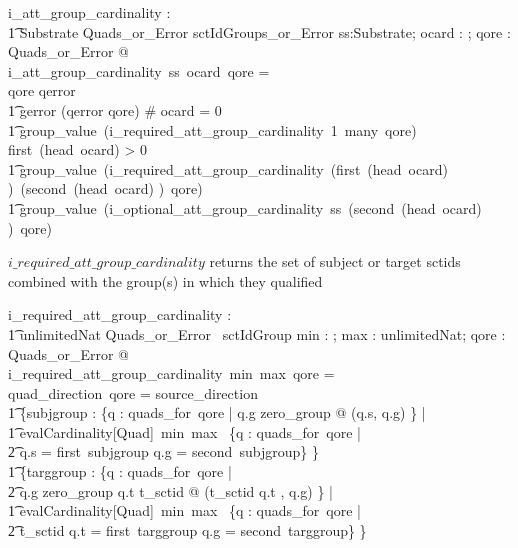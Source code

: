 \documentclass{article}
\begin{document}
\begin{gendef}
   i\_att\_group\_cardinality : \\
\t1 Substrate \fun \optional[cardinality] \fun Quads\_or\_Error \fun sctIdGroups\_or\_Error
\where
   \forall ss:Substrate; ocard : \optional[cardinality]; qore : Quads\_or\_Error @ \\
   i\_att\_group\_cardinality~ss~ocard~qore = \\
\IF qore \in \ran qerror \THEN \\
\t1 gerror (qerror \inv qore) 
\also
\ELSE \IF \# ocard = 0 \THEN \\
\t1 group\_value~(i\_required\_att\_group\_cardinality~1~many~qore)
\also
\ELSE \IF first~(head~ocard) > 0 \THEN \\
\t1 group\_value~(i\_required\_att\_group\_cardinality~(first~(head~ocard) )~(second~(head~ocard) )~qore)
\also
\ELSE \\
\t1 group\_value~(i\_optional\_att\_group\_cardinality~ss~(second~(head~ocard) )~qore)
\end{gendef}

$i\_required\_att\_group\_cardinality$ returns the set of subject or target sctids combined with the group(s) in which they qualified
\begin{gendef}
   i\_required\_att\_group\_cardinality : \\
\t1 \nat \fun unlimitedNat \fun Quads\_or\_Error \ \fun \power sctIdGroup
\where
   \forall min : \nat; max : unlimitedNat; qore : Quads\_or\_Error  @ \\
i\_required\_att\_group\_cardinality~min~max~qore = \\
\IF quad\_direction~qore = source\_direction \THEN \\
\t1 \{subjgroup :  \{q : quads\_for~qore | q.g \neq zero\_group @ (q.s, q.g) \} | \\
\t1 evalCardinality[Quad]~min~max~ \{q : quads\_for~qore | \\
\t2 q.s = first~subjgroup \land q.g = second~subjgroup\} \neq \emptyset \}
\also
\ELSE \\
\t1 \{targgroup :  \{q : quads\_for~qore | \\
\t2 q.g \neq zero\_group \land q.t \in \ran t\_sctid @ (t\_sctid \inv q.t , q.g) \} | \\
\t1 evalCardinality[Quad]~min~max~ \{q : quads\_for~qore | \\
\t2 t\_sctid \inv q.t = first~targgroup \land q.g = second~targgroup\} \neq \emptyset \}
\end{gendef}
\end{document}
